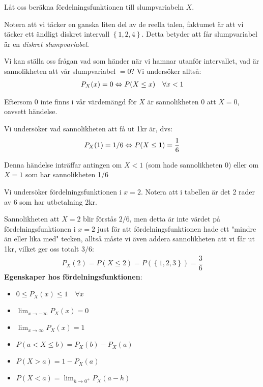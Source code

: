 \par\bigskip
\noindent Låt oss beräkna fördelningsfunktionen till slumpvariabeln $X$.\par
\noindent Notera att vi täcker en ganska liten del av de reella talen, faktumet är att vi täcker ett ändligt diskret intervall $\left\{1,2,4\right\}$. Detta betyder att får slumpvariabel är en \textit{diskret slumpvariabel}.\par
\noindent Vi kan ställa oss frågan vad som händer när vi hamnar utanför intervallet, vad är sannolikheten att vår slumpvariabel $=0$? Vi undersöker alltså:
\begin{equation*}
  \begin{gathered}
    P_X(x) = 0\Leftrightarrow P(X\leq x)\quad\forall x<1
  \end{gathered}
\end{equation*}\par
\noindent Eftersom $0$ inte finns i vår värdemängd för $X$ är sannolikheten 0 att $X=0$, oavsett händelse.
\par\bigskip
\noindent Vi undersöker vad sannolikheten att få ut 1kr är, dvs:
\begin{equation*}
  \begin{gathered}
    P_X(1) = 1/6\Leftrightarrow P(X\leq1) = \dfrac{1}{6}
  \end{gathered}
\end{equation*}\par
\noindent Denna händelse inträffar antingen om $X<1$ (som hade sannolikheten 0) eller om $X=1$ som har sannolikheten 1/6
\par\bigskip
\noindent Vi undersöker fördelningsfunktionen i $x = 2$. Notera att i tabellen är det 2 rader av 6 som har utbetalning 2kr.\par
\noindent Sannolikheten att $X=2$ blir förstås $2/6$, men detta är inte värdet på fördelningsfunktionen i $x=2$ just för att fördelningsfunktionen hade ett "mindre än eller lika med" tecken, alltså måste vi även addera sannolikheten att vi får ut 1kr, vilket ger oss totalt $3/6$:
\begin{equation*}
  \begin{gathered}
    P_X(2) = P(X\leq 2) = P(\left\{1,2,3\right\}) = \dfrac{3}{6}
  \end{gathered}
\end{equation*}
\newpage
\noindent\textbf{Egenskaper hos fördelningsfunktionen}:
\begin{itemize}
  \item $0\leq P_X(x)\leq 1\quad\forall x$
  \item $\lim_{x\to-\infty}P_X(x) = 0$
  \item $\lim_{x\to\infty}P_X(x) = 1$
  \item $P(a<X\leq b) = P_X(b)-P_X(a)$
  \item $P(X>a) = 1-P_X(a)$
  \item $P(X<a) = \lim_{h\to0^+}P_X(a-h)$
\end{itemize}
